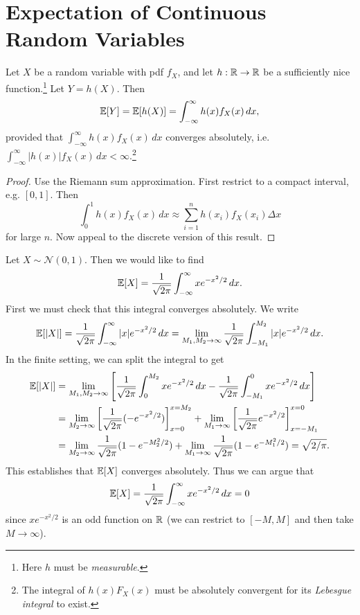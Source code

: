 \section{Expectation of Continuous Random Variables}
\begin{theorem}
  Let $X$ be a random variable with pdf $f_X$, and let
  $h : \mathbb{R} \to \mathbb{R}$ be a sufficiently nice function.\footnote{Here $h$ must be \emph{measurable}.}
  Let $Y = h(X)$. Then
  \[
    \mathbb{E}[Y] = \mathbb{E}[h(X)] = \int_{-\infty}^\infty h(x) f_X(x) \, dx,
  \]
  provided that
  $\displaystyle \int_{-\infty}^\infty h(x) f_X(x) \, dx$ converges
  absolutely, i.e.
  $\displaystyle \int_{-\infty}^\infty |h(x)| f_X(x) \, dx < \infty$.\footnote{The integral of $h(x) F_X(x)$ must be absolutely convergent for its \emph{Lebesgue integral} to exist.}
\end{theorem}

\begin{proof}
  Use the Riemann sum approximation. First
  restrict to a compact interval, e.g. $[0, 1]$.
  Then
  \[
    \int_0^1 h(x) f_X(x) \, dx
    \approx \sum_{i = 1}^n h(x_i) f_X(x_i) \Delta x
  \]
  for large $n$. Now appeal to the discrete
  version of this result.
\end{proof}

\begin{example}
  Let $X \sim \mathcal{N}(0, 1)$. Then we would like
  to find
  \[
    \mathbb{E}[X] = \frac{1}{\sqrt{2\pi}} \int_{-\infty}^\infty x e^{-x^2 / 2} \, dx.
  \]
  First we must check that this integral
  converges absolutely. We write
  \[
    \mathbb{E}[|X|]
    = \frac{1}{\sqrt{2\pi}} \int_{-\infty}^\infty |x| e^{-x^2 / 2}\, dx
    = \lim_{M_1, M_2 \to \infty}
    \frac{1}{\sqrt{2\pi}} \int_{-M_1}^{M_2} |x| e^{-x^2 / 2} \, dx.
  \]
  In the finite setting, we can split the integral to
  get
  \begin{align*}
    \mathbb{E}[|X|]
    &= \lim_{M_1, M_2 \to \infty}
    \left[
      \frac{1}{\sqrt{2\pi}} \int_0^{M_2} x e^{-x^2 / 2} \, dx
      - \frac{1}{\sqrt{2\pi}} \int_{-M_1}^0 x e^{-x^2 / 2} \, dx
    \right] \\
    &= \lim_{M_2 \to \infty} \left[\frac{1}{\sqrt{2\pi}} (-e^{-x^2 / 2})\right]_{x = 0}^{x = M_2}
    + \lim_{M_1 \to \infty} \left[\frac{1}{\sqrt{2\pi}} e^{-x^2 / 2}\right]_{x = -M_1}^{x = 0} \\
    &= \lim_{M_2 \to \infty} \frac{1}{\sqrt{2\pi}} (1 - e^{-M_2^2 / 2})
    + \lim_{M_1 \to \infty} \frac{1}{\sqrt{2\pi}} (1 - e^{-M_1^2 / 2})
    = \sqrt{2 / \pi}.
  \end{align*}
  This establishes that $\mathbb{E}[X]$ converges
  absolutely. Thus we can argue that
  \[
    \mathbb{E}[X] = \frac{1}{\sqrt{2\pi}} \int_{-\infty}^\infty x e^{-x^2 / 2} \, dx = 0
  \]
  since $x e^{-x^2 / 2}$ is an odd function on $\mathbb{R}$
  (we can restrict to $[-M, M]$
  and then take $M \to \infty$).
\end{example}


